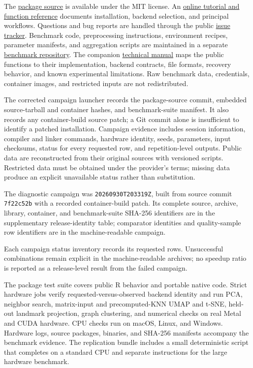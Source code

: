 \documentclass[article]{jss}
\begin{document}
The \href{https://github.com/tkcaccia/fastEmbedR}{package source} is available
under the MIT license. An
\href{https://tkcaccia.github.io/fastEmbedR/}{online tutorial and function
reference} documents installation, backend selection, and principal workflows.
Questions and bug reports are handled through the public
\href{https://github.com/tkcaccia/fastEmbedR/issues}{issue tracker}.
Benchmark code, preprocessing instructions, environment recipes, parameter
manifests, and aggregation scripts are maintained in a separate
\href{https://github.com/tkcaccia/fastEmbedR-extra}{benchmark repository}.
The companion
\href{https://github.com/tkcaccia/fastEmbedR-extra/blob/main/manual/TECHNICAL_MANUAL.md}{technical manual}
maps the public functions to their implementation, backend contracts,
file formats, recovery behavior, and known experimental limitations.
Raw benchmark data, credentials, container images, and restricted inputs are
not redistributed.

The corrected campaign launcher records the package-source commit,
embedded source-tarball and container hashes, and benchmark-suite manifest.
It also records any container-build source patch; a Git commit alone is
insufficient to identify a patched installation. Campaign evidence includes
session information, compiler and linker
commands, hardware identity, seeds, parameters, input checksums, status for
every requested row, and repetition-level outputs. Public data are
reconstructed from their original sources with versioned scripts. Restricted
data must be obtained under the provider's terms; missing data produce an
explicit unavailable status rather than substitution.

The diagnostic campaign was \texttt{20260930T203319Z}, built from source
commit \texttt{7f22c52b} with a recorded container-build patch. Its
complete source, archive, library, container, and
benchmark-suite SHA-256 identifiers are in the supplementary
release-identity table; comparator identities and
quality-sample row identifiers are in the machine-readable campaign.

Each campaign status inventory records its requested rows. Unsuccessful
combinations remain explicit in the machine-readable archives; no speedup
ratio is reported as a release-level result from the failed campaign.

The package test suite covers public R behavior and portable native code.
Strict hardware jobs verify requested-versus-observed backend identity and run
PCA, neighbor search, matrix-input and precomputed-KNN UMAP and t-SNE,
held-out landmark projection, graph clustering, and numerical checks on real
Metal and CUDA hardware. CPU checks run on macOS, Linux, and Windows.
Hardware logs, source packages, binaries, and SHA-256 manifests accompany the
benchmark evidence. The replication bundle includes a small deterministic
 script that completes on a standard CPU and separate instructions
for the large hardware benchmark.
\end{document}

